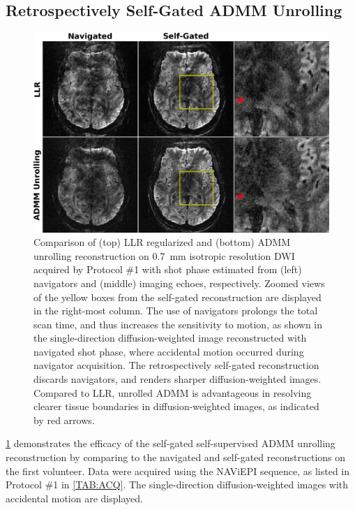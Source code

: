 \documentclass[AMA,STIX2COL,Linenumberson]{MRM}
\begin{document}
\subsection{Retrospectively Self-Gated ADMM Unrolling}

\begin{figure}
	\includegraphics[width=\textwidth]{./figures/fig4.png}
	\caption{Comparison of (top) LLR regularized
		and (bottom) ADMM unrolling
		reconstruction on 0.7~mm isotropic resolution DWI
		acquired by Protocol \#1
		with shot phase estimated from
		(left) navigators and (middle) imaging echoes, respectively.
		Zoomed views of the yellow boxes from the self-gated reconstruction
		are displayed in the right-most column.
		The use of navigators prolongs the total scan time,
		and thus increases the sensitivity to motion,
		as shown in the single-direction diffusion-weighted image
		reconstructed with navigated shot phase,
		where accidental motion occurred during navigator acquisition.
		The retrospectively self-gated reconstruction discards navigators,
		and renders sharper diffusion-weighted images.
		Compared to LLR, unrolled ADMM is advantageous
		in resolving clearer tissue boundaries
		in diffusion-weighted images,
		as indicated by red arrows.}
	\label{FIG:MOTION_RETRO_TRA}
\end{figure}

\cref{FIG:MOTION_RETRO_TRA} demonstrates
the efficacy of the self-gated self-supervised ADMM unrolling reconstruction
by comparing to the navigated and self-gated reconstructions
on the first volunteer.
Data were acquired using the NAViEPI sequence,
as listed in Protocol \#1 in \cref{TAB:ACQ}.
The single-direction diffusion-weighted images with accidental motion
are displayed.
\end{document}
